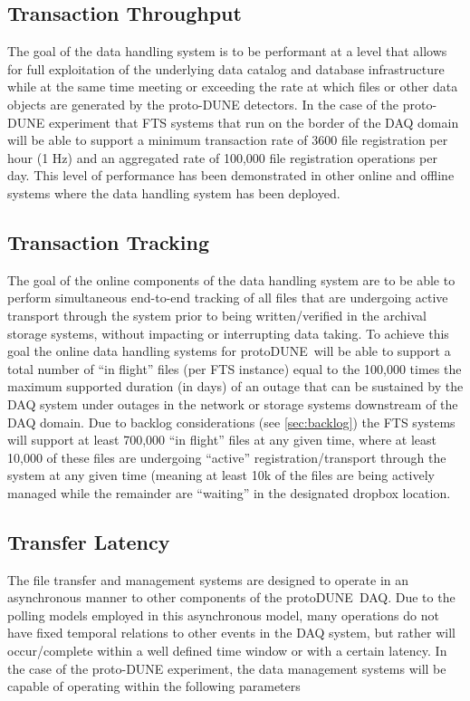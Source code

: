 \documentclass[pdftex,12pt,letter]{article}
\newcommand{\pd}{protoDUNE\ }
\begin{document}
\subsection{Transaction Throughput}

The goal of the data handling system is to be performant at a level that allows for full exploitation of the underlying data
catalog and database infrastructure while at the same time meeting or exceeding the rate at which files or other data
objects are generated by the proto-DUNE detectors.  In the case of the proto-DUNE experiment that FTS systems that run on
the border of the DAQ domain will be able to support a minimum transaction rate of 3600 file registration per hour (1 Hz)
and an aggregated rate of 100,000 file registration operations per day.  This level of performance has been demonstrated
in other online and offline systems where the data handling system has been deployed.

\subsection{Transaction Tracking}
The goal of the online components of the data handling system are to be able to perform simultaneous end-to-end tracking
of all files that are undergoing active transport through the system prior to being written/verified in the archival storage systems,
without impacting or interrupting data taking.  To achieve this goal the online data handling systems for \pd will be
able to support a total number of “in flight” files (per FTS instance) equal to the 100,000 times the maximum supported duration (in days)
of an outage that can be sustained by the DAQ system under outages in the network or storage systems downstream of the DAQ domain.
Due to backlog considerations (see \ref{sec:backlog}) the FTS systems will support at least 700,000 “in flight” files at any given time, where at least 10,000 of these
files are undergoing “active” registration/transport through the system at any given time (meaning at least 10k of the files are being actively
managed while the remainder are “waiting” in the designated dropbox location.

\subsection{Transfer Latency}
The file transfer and management systems are designed to operate in an asynchronous manner to other components of the \pd DAQ. 
Due to the polling models employed in this asynchronous model, many operations do not have fixed temporal relations to other events in the DAQ system,
but rather will occur/complete within a well defined time window or with a certain latency.  In the case of the proto-DUNE experiment,
the data management systems will be capable of operating within the following parameters
\end{document}
